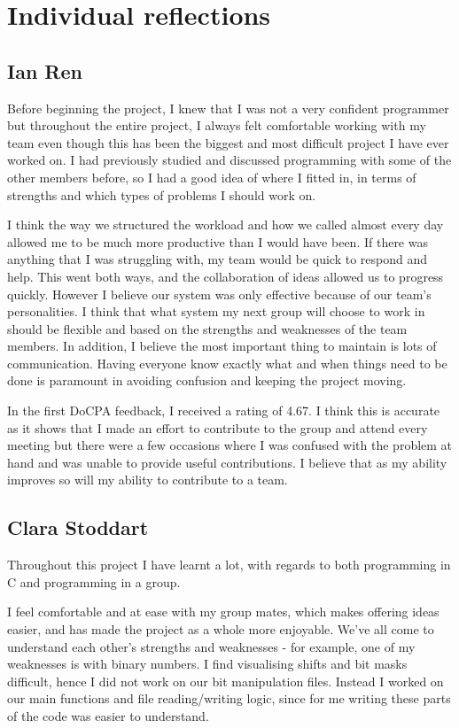 \documentclass[11pt]{article}
\begin{document}
\section*{Individual reflections}

\subsection*{Ian Ren}
Before beginning the project, I knew that I was not a very confident programmer but throughout the entire project, I always felt comfortable working with my team even though this has been the biggest and most difficult project I have ever worked on. I had previously studied and discussed programming with some of the other members before, so I had a good idea of where I fitted in, in terms of strengths and which types of problems I should work on.

I think the way we structured the workload and how we called almost every day allowed me to be much more productive than I would have been. If there was anything that I was struggling with, my team would be quick to respond and help. This went both ways, and the collaboration of ideas allowed us to progress quickly. However I believe our system was only effective because of our team’s personalities. I think that what system my next group will choose to work in should be flexible and based on the strengths and weaknesses of the team members. In addition, I believe the most important thing to maintain is lots of communication. Having everyone know exactly what and when things need to be done is paramount in avoiding confusion and keeping the project moving.

In the first DoCPA feedback, I received a rating of 4.67. I think this is accurate as it shows that I made an effort to contribute to the group and attend every meeting but there were a few occasions where I was confused with the problem at hand and was unable to provide useful contributions. I believe that as my ability improves so will my ability to contribute to a team.

\subsection*{Clara Stoddart}
Throughout this project I have learnt a lot, with regards to both programming in C and programming in a group.

I feel comfortable and at ease with my group mates, which makes offering ideas easier, and has made the project as a whole more enjoyable. We've all come to understand each other's strengths and weaknesses - for example, one of my weaknesses is with binary numbers. I find visualising shifts and bit masks difficult, hence I did not work on our bit manipulation files. Instead I worked on our main functions and file reading/writing logic, since for me writing these parts of the code was easier to understand.
\end{document}
